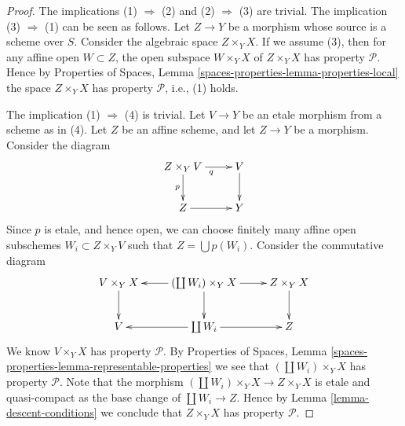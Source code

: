 \begin{proof}
The implications (1) $\Rightarrow$ (2) and (2) $\Rightarrow$ (3) are trivial.
The implication (3) $\Rightarrow$ (1) can be seen as follows.
Let $Z \to Y$ be a morphism whose source is a scheme over $S$.
Consider the algebraic space $Z \times_Y X$. If we assume (3), then
for any affine open $W \subset Z$, the open subspace
$W \times_Y X$ of $Z \times_Y X$ has property $\mathcal{P}$. Hence by
Properties of Spaces, Lemma \ref{spaces-properties-lemma-properties-local}
the space $Z \times_Y X$ has property $\mathcal{P}$, i.e., (1) holds.

\medskip\noindent
The implication (1) $\Rightarrow$ (4) is trivial. Let $V \to Y$ be
an etale morphism from a scheme as in (4). Let $Z$ be an affine scheme,
and let $Z \to Y$ be a morphism. Consider the diagram
$$
\xymatrix{
Z \times_Y V \ar[r]_q \ar[d]_p & V \ar[d] \\
Z \ar[r] & Y
}
$$
Since $p$ is etale, and hence open, we can choose finitely many affine open
subschemes $W_i \subset Z \times_Y V$ such that $Z = \bigcup p(W_i)$.
Consider the commutative diagram
$$
\xymatrix{
V \times_Y X \ar[d] &
(\coprod W_i) \times_Y X \ar[l] \ar[d] \ar[r] &
Z \times_Y X \ar[d] \\
V &
\coprod W_i \ar[l] \ar[r] &
Z
}
$$
We know $V \times_Y X$ has property $\mathcal{P}$. By 
Properties of Spaces,
Lemma \ref{spaces-properties-lemma-representable-properties}
we see that $(\coprod W_i) \times_Y X$ has property $\mathcal{P}$.
Note that the morphism $(\coprod W_i) \times_Y X \to Z \times_Y X$
is etale and quasi-compact as the base change of $\coprod W_i \to Z$.
Hence by Lemma \ref{lemma-descent-conditions}
we conclude that $Z \times_Y X$ has property $\mathcal{P}$.
\end{proof}

